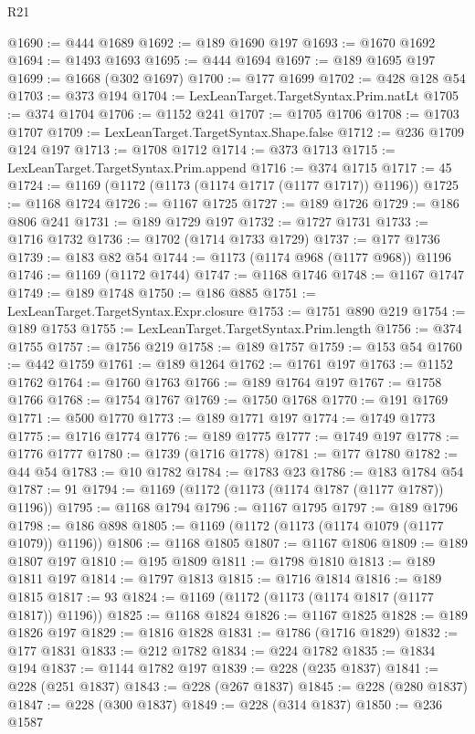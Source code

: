 \begin{lexlean}{R21}
\begin{coremodule}
@1690 := @444 @1689
@1692 := @189 @1690 @197
@1693 := @1670 @1692
@1694 := @1493 @1693
@1695 := @444 @1694
@1697 := @189 @1695 @197
@1699 := @1668 (@302 @1697)
@1700 := @177 @1699
@1702 := @428 @128 @54
@1703 := @373 @194
@1704 := LexLeanTarget.TargetSyntax.Prim.natLt
@1705 := @374 @1704
@1706 := @1152 @241
@1707 := @1705 @1706
@1708 := @1703 @1707
@1709 := LexLeanTarget.TargetSyntax.Shape.false
@1712 := @236 @1709 @124 @197
@1713 := @1708 @1712
@1714 := @373 @1713
@1715 := LexLeanTarget.TargetSyntax.Prim.append
@1716 := @374 @1715
@1717 := 45
@1724 := @1169 (@1172 (@1173 (@1174 @1717 (@1177 @1717)) @1196))
@1725 := @1168 @1724
@1726 := @1167 @1725
@1727 := @189 @1726
@1729 := @186 @806 @241
@1731 := @189 @1729 @197
@1732 := @1727 @1731
@1733 := @1716 @1732
@1736 := @1702 (@1714 @1733 @1729)
@1737 := @177 @1736
@1739 := @183 @82 @54
@1744 := @1173 (@1174 @968 (@1177 @968)) @1196
@1746 := @1169 (@1172 @1744)
@1747 := @1168 @1746
@1748 := @1167 @1747
@1749 := @189 @1748
@1750 := @186 @885
@1751 := LexLeanTarget.TargetSyntax.Expr.closure
@1753 := @1751 @890 @219
@1754 := @189 @1753
@1755 := LexLeanTarget.TargetSyntax.Prim.length
@1756 := @374 @1755
@1757 := @1756 @219
@1758 := @189 @1757
@1759 := @153 @54
@1760 := @442 @1759
@1761 := @189 @1264
@1762 := @1761 @197
@1763 := @1152 @1762
@1764 := @1760 @1763
@1766 := @189 @1764 @197
@1767 := @1758 @1766
@1768 := @1754 @1767
@1769 := @1750 @1768
@1770 := @191 @1769
@1771 := @500 @1770
@1773 := @189 @1771 @197
@1774 := @1749 @1773
@1775 := @1716 @1774
@1776 := @189 @1775
@1777 := @1749 @197
@1778 := @1776 @1777
@1780 := @1739 (@1716 @1778)
@1781 := @177 @1780
@1782 := @44 @54
@1783 := @10 @1782
@1784 := @1783 @23
@1786 := @183 @1784 @54
@1787 := 91
@1794 := @1169 (@1172 (@1173 (@1174 @1787 (@1177 @1787)) @1196))
@1795 := @1168 @1794
@1796 := @1167 @1795
@1797 := @189 @1796
@1798 := @186 @898
@1805 := @1169 (@1172 (@1173 (@1174 @1079 (@1177 @1079)) @1196))
@1806 := @1168 @1805
@1807 := @1167 @1806
@1809 := @189 @1807 @197
@1810 := @195 @1809
@1811 := @1798 @1810
@1813 := @189 @1811 @197
@1814 := @1797 @1813
@1815 := @1716 @1814
@1816 := @189 @1815
@1817 := 93
@1824 := @1169 (@1172 (@1173 (@1174 @1817 (@1177 @1817)) @1196))
@1825 := @1168 @1824
@1826 := @1167 @1825
@1828 := @189 @1826 @197
@1829 := @1816 @1828
@1831 := @1786 (@1716 @1829)
@1832 := @177 @1831
@1833 := @212 @1782
@1834 := @224 @1782
@1835 := @1834 @194
@1837 := @1144 @1782 @197
@1839 := @228 (@235 @1837)
@1841 := @228 (@251 @1837)
@1843 := @228 (@267 @1837)
@1845 := @228 (@280 @1837)
@1847 := @228 (@300 @1837)
@1849 := @228 (@314 @1837)
@1850 := @236 @1587

\end{coremodule}
\end{lexlean}
